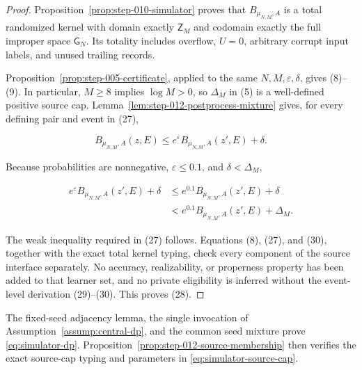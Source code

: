 \begin{proof}
Proposition~\ref{prop:step-010-simulator} proves that
\(B_{\mu_{N,M},A}\) is a total randomized kernel with domain exactly
\(\mathsf Z_M\) and codomain exactly the full improper space
\(\mathsf G_N\).  Its totality includes overflow, \(U=0\), arbitrary
corrupt input labels, and unused trailing records.

Proposition~\ref{prop:step-005-certificate}, applied to the same
\(N,M,\varepsilon,\delta\), gives (8)--(9).  In particular, \(M\ge8\)
implies \(\log M>0\), so \(\Delta_M\) in (5) is a well-defined positive
source cap.  Lemma~\ref{lem:step-012-postprocess-mixture} gives, for every
defining pair and event in (27),

\[
  B_{\mu_{N,M},A}(z,E)
  \le e^\varepsilon B_{\mu_{N,M},A}(z',E)+\delta.
\tag{29}
\]

Because probabilities are nonnegative, \(\varepsilon\le0.1\), and
\(\delta<\Delta_M\),

\[
\begin{aligned}
  e^\varepsilon B_{\mu_{N,M},A}(z',E)+\delta
  &\le e^{0.1}B_{\mu_{N,M},A}(z',E)+\delta\\
  &< e^{0.1}B_{\mu_{N,M},A}(z',E)+\Delta_M.
\end{aligned}
\tag{30}
\]

The weak inequality required in (27) follows.  Equations (8), (27), and
(30), together with the exact total kernel typing, check every component
of the source interface separately.  No accuracy, realizability, or
properness property has been added to that learner set, and no private
eligibility is inferred without the event-level derivation (29)--(30).
This proves (28). \end{proof}
The fixed-seed adjacency lemma, the single invocation of
Assumption~\ref{assump:central-dp}, and the common seed mixture prove
\eqref{eq:simulator-dp}.  Proposition~\ref{prop:step-012-source-membership}
then verifies the exact source-cap typing and parameters in
\eqref{eq:simulator-source-cap}.

